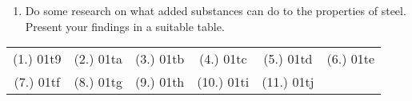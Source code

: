 \begin{eocexercises}{}
\begin{enumerate}
\item Do some research on what added substances can do to the properties of steel. Present your findings in a suitable table.
 
\end{enumerate}

\par \practiceinfo
\par \begin{tabular}[h]{cccccc}
(1.)	01t9	&
(2.)	01ta	&
(3.)	01tb	&
(4.)	01tc	&
(5.)	01td	&
(6.)	01te	\\ %
(7.)	01tf	&
(8.)	01tg	&
(9.)	01th	&
(10.)	01ti	&
(11.)	01tj	&
\end{tabular}

\end{eocexercises}




